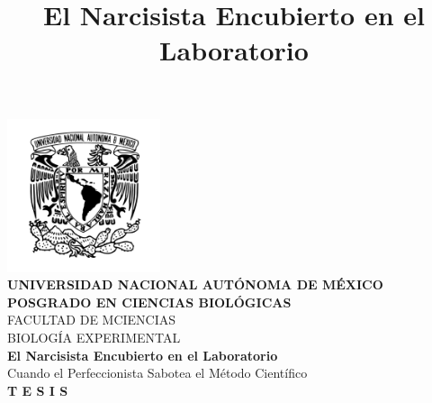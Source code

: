 \documentclass[
  10pt]{article}
\title{El Narcisista Encubierto en el Laboratorio}
\begin{document}

\pagestyle{plain} %

\begin{titlepage}
    \begin{center}
        \vspace*{-0.5cm} %
        
        \includegraphics[width=4.5cm]{ figuras/unam.png }\\[0.5cm]
        
        {\large \textbf{UNIVERSIDAD NACIONAL AUTÓNOMA DE MÉXICO}}\\[0.4cm]
        
        {\large \textbf{\MakeUppercase{Posgrado en Ciencias
Biológicas}}}\\[1cm]
        
        {\large \MakeUppercase{Facultad de mCiencias}}\\[0.4cm]
        {\large \MakeUppercase{Biología Experimental}}\\[1.2cm]
        
        {\Large \textbf{El Narcisista Encubierto en el
Laboratorio}}\\[0.3cm]
        {\small  Cuando el Perfeccionista Sabotea el Método
Científico }\\[0.6cm]
        
        {\LARGE \textbf{T E S I S}}\\[1cm]
        

\end{center}
\end{titlepage}
\end{document}
